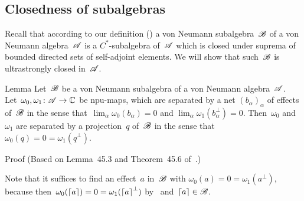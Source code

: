 \documentclass[a]{subfiles}
\begin{document}
\subsection{Closedness of subalgebras}
\begin{parsec}%
\begin{point}%
Recall that according to our definition ()
a von Neumann subalgebra~$\mathscr{B}$ 
of a von Neumann algebra~$\mathscr{A}$
is a $C^*$-subalgebra of~$\mathscr{A}$
which is closed under suprema
of bounded directed sets of self-adjoint elements.
We will show that such~$\mathscr{B}$ is ultrastrongly closed in~$\mathscr{A}$.
\end{point}
\begin{point}{Lemma}%
Let~$\mathscr{B}$ be a von Neumann subalgebra
of a von Neumann algebra~$\mathscr{A}$.
Let~$\omega_0,\omega_1\colon \mathscr{A}\to\mathbb{C}$
be npu-maps,
which are separated
by a net $(b_\alpha)_\alpha$
of effects of~$\mathscr{B}$ 
in the sense that~$\lim_\alpha \omega_0(b_\alpha)=0$
and $\lim_\alpha \omega_1(b_\alpha^\perp)=0$.
Then~$\omega_0$ and~$\omega_1$ are separated by a 
projection~$q$ of~$\mathscr{B}$ 
in the sense that~$\omega_0(q)= 0 = \omega_1(q^\perp)$.
\begin{point}{Proof}%
(Based on Lemma~45.3 and Theorem~45.6 of~\cite{conway2000}.)

Note that it suffices to find an effect~$a$ in~$\mathscr{B}$
with $\omega_0(a) = 0 = \omega_1(a^\perp)$,
because then~$\omega_0(\left\lceil a\right\rceil) = 0 = \omega_1(\left\lceil a\right\rceil^\perp)$
by~
and~$\left\lceil a\right\rceil\in\mathscr{B}$.


\end{point}
\end{point}
\end{parsec}
\end{document}
